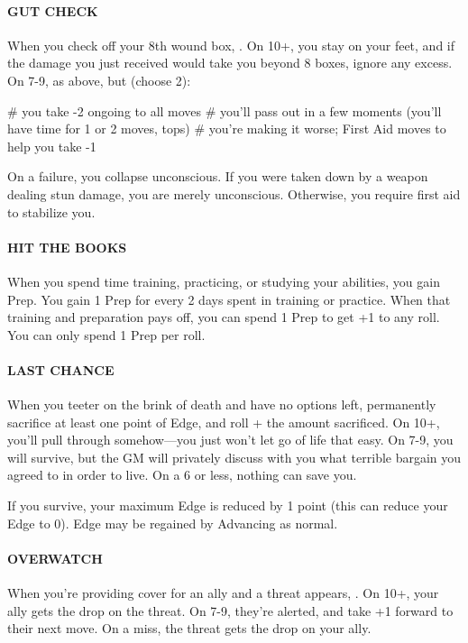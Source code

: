 \paragraph{GUT CHECK}
When you check off your 8th wound box, . On 10+, you stay on your feet, and if the damage you just received would take you beyond 8 boxes, ignore any excess. On 7-9, as above, but (choose 2):
\begin{easylist}
    # you take -2 ongoing to all moves
    # you’ll pass out in a few moments (you’ll have time for 1 or 2 moves, tops)
    # you’re making it worse; First Aid moves to help you take -1
\end{easylist}
On a failure, you collapse unconscious. If you were taken down by a weapon dealing stun damage, you are merely unconscious. Otherwise, you require first aid to stabilize you.

\paragraph{HIT THE BOOKS}
When you spend time training, practicing, or studying your abilities, you gain Prep. You gain 1 Prep for every 2 days spent in training or practice. When that training and preparation pays off, you can spend 1 Prep to get +1 to any roll. You can only spend 1 Prep per roll.

\paragraph{LAST CHANCE}
When you teeter on the brink of death and have no options left, permanently sacrifice at least one point of Edge, and roll + the amount sacrificed. On 10+, you’ll pull through somehow—you just won’t let go of life that easy. On 7-9, you will survive, but the GM will privately discuss with you what terrible bargain you agreed to in order to live. On a 6 or less, nothing can save you.

If you survive, your maximum Edge is reduced by 1 point (this can reduce your Edge to 0). Edge may be regained by Advancing as normal.

\paragraph{OVERWATCH}
When you’re providing cover for an ally and a threat appears, . On 10+, your ally gets the drop on the threat. On 7-9, they’re alerted, and take +1 forward to their next move. On a miss, the threat gets the drop on your ally.

